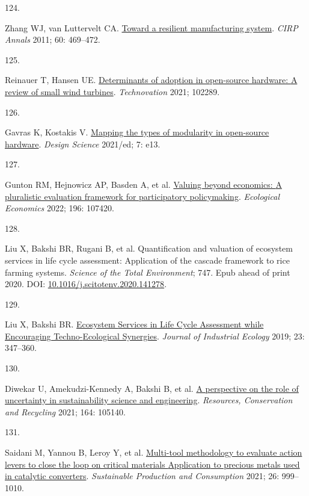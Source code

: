 \documentclass[
  12pt,
  a4paperpaper,
  onecolumn]{article}
\newlength{\cslhangindent}
\newlength{\csllabelwidth}
\newlength{\cslentryspacingunit} %
\newenvironment{CSLReferences}[2] %
 {%
  \setlength{\parindent}{0pt}
  \ifodd #1
  \let\oldpar\par
  \def\par{\hangindent=\cslhangindent\oldpar}
  \fi
  \setlength{\parskip}{#2\cslentryspacingunit}
 }%
 {}
\newcommand{\CSLLeftMargin}[1]{\parbox[t]{\csllabelwidth}{#1}}
\newcommand{\CSLRightInline}[1]{\parbox[t]{\linewidth - \csllabelwidth}{#1}\break}
\begin{document}
\begin{CSLReferences}{0}{0}
\leavevmode{}%
\CSLLeftMargin{124. }%
\CSLRightInline{Zhang WJ, van Luttervelt CA.
\href{https://doi.org/10.1016/j.cirp.2011.03.041}{Toward a resilient
manufacturing system}. \emph{CIRP Annals} 2011; 60: 469--472.}

\leavevmode{}%
\CSLLeftMargin{125. }%
\CSLRightInline{Reinauer T, Hansen UE.
\href{https://doi.org/10.1016/j.technovation.2021.102289}{Determinants
of adoption in open-source hardware: {A} review of small wind turbines}.
\emph{Technovation} 2021; 102289.}

\leavevmode{}%
\CSLLeftMargin{126. }%
\CSLRightInline{Gavras K, Kostakis V.
\href{https://doi.org/10.1017/dsj.2021.11}{Mapping the types of
modularity in open-source hardware}. \emph{Design Science} 2021/ed; 7:
e13.}

\leavevmode{}%
\CSLLeftMargin{127. }%
\CSLRightInline{Gunton RM, Hejnowicz AP, Basden A, et al.
\href{https://doi.org/10.1016/j.ecolecon.2022.107420}{Valuing beyond
economics: {A} pluralistic evaluation framework for participatory
policymaking}. \emph{Ecological Economics} 2022; 196: 107420.}

\leavevmode{}%
\CSLLeftMargin{128. }%
\CSLRightInline{Liu X, Bakshi BR, Rugani B, et al. Quantification and
valuation of ecosystem services in life cycle assessment: {Application}
of the cascade framework to rice farming systems. \emph{Science of the
Total Environment}; 747. Epub ahead of print 2020. DOI:
\href{https://doi.org/10.1016/j.scitotenv.2020.141278}{10.1016/j.scitotenv.2020.141278}.}

\leavevmode{}%
\CSLLeftMargin{129. }%
\CSLRightInline{Liu X, Bakshi BR.
\href{https://doi.org/10.1111/jiec.12755}{Ecosystem {Services} in {Life
Cycle Assessment} while {Encouraging Techno}-{Ecological Synergies}}.
\emph{Journal of Industrial Ecology} 2019; 23: 347--360.}

\leavevmode{}%
\CSLLeftMargin{130. }%
\CSLRightInline{Diwekar U, Amekudzi-Kennedy A, Bakshi B, et al.
\href{https://doi.org/10.1016/j.resconrec.2020.105140}{A perspective on
the role of uncertainty in sustainability science and engineering}.
\emph{Resources, Conservation and Recycling} 2021; 164: 105140.}

\leavevmode{}%
\CSLLeftMargin{131. }%
\CSLRightInline{Saidani M, Yannou B, Leroy Y, et al.
\href{https://doi.org/10.1016/j.spc.2021.01.010}{Multi-tool methodology
to evaluate action levers to close the loop on critical materials
\textendash{} {Application} to precious metals used in catalytic
converters}. \emph{Sustainable Production and Consumption} 2021; 26:
999--1010.}


\end{CSLReferences}
\end{document}
